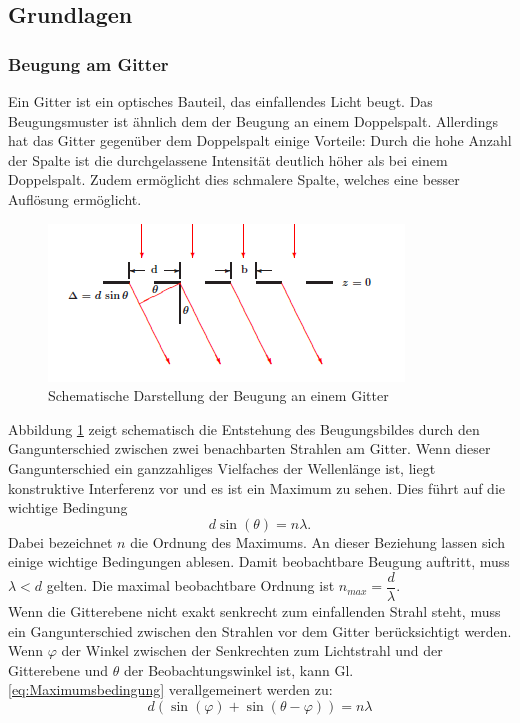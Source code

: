\documentclass[12pt,a4paper]{article}
\begin{document}
\subsection{Grundlagen}
\subsubsection{Beugung am Gitter}
Ein Gitter ist ein optisches Bauteil, das einfallendes Licht beugt. Das Beugungsmuster ist ähnlich dem der Beugung an einem Doppelspalt. Allerdings hat das Gitter gegenüber dem Doppelspalt einige Vorteile: Durch die hohe Anzahl der Spalte ist die durchgelassene Intensität deutlich höher als bei einem Doppelspalt. Zudem ermöglicht dies schmalere Spalte, welches eine besser Auflösung ermöglicht.\\
\begin{figure}
\begin{center}
\includegraphics[scale=1.2]{Bilder/Gitterbeugung_Schema.PNG}
\end{center}
\caption[Gitterbeugung Schema]{Schematische Darstellung der Beugung an einem Gitter}
\label{fig:Gitterbeugung_Schema}
\end{figure}
Abbildung \ref{fig:Gitterbeugung_Schema} zeigt schematisch die Entstehung des Beugungsbildes durch den Gangunterschied zwischen zwei benachbarten Strahlen am Gitter. Wenn dieser Gangunterschied ein ganzzahliges Vielfaches der Wellenlänge ist, liegt konstruktive Interferenz vor und es ist ein Maximum zu sehen. Dies führt auf die wichtige Bedingung
\begin{equation}
d \sin (\theta) = n \lambda.
\label{eq:Maximumsbedingung}
\end{equation}
Dabei bezeichnet $n$ die Ordnung des Maximums. An dieser Beziehung lassen sich einige wichtige Bedingungen ablesen. Damit beobachtbare Beugung auftritt, muss $\lambda < d$ gelten. Die maximal beobachtbare Ordnung ist $n_{max} = \dfrac{d}{\lambda}$. \\
Wenn die Gitterebene nicht exakt senkrecht zum einfallenden Strahl steht, muss ein Gangunterschied zwischen den Strahlen vor dem Gitter berücksichtigt werden. Wenn $\varphi$ der Winkel zwischen der Senkrechten zum Lichtstrahl und der Gitterebene und $\theta$ der Beobachtungswinkel ist, kann Gl. \ref{eq:Maximumsbedingung} verallgemeinert werden zu:
\begin{equation}
d(\sin(\varphi) + \sin(\theta - \varphi)) = n \lambda
\label{eq:VerallgemeinerteMaximumsbedingung}
\end{equation}
\end{document}
